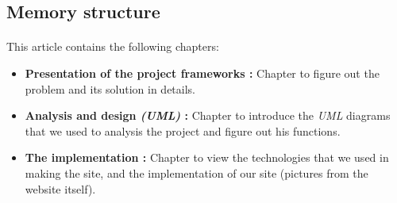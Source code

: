 	\subsection{Memory structure}
		\paragraph{}
		This article contains the following chapters:
			\begin{itemize}
				
				\item \textbf{Presentation of the project frameworks :}
				Chapter to figure out the problem and its solution in details.
				
				\item \textbf{Analysis and design \textit{(UML)} :}
				Chapter to introduce the \textit{UML} diagrams that we used to analysis the project and figure out his functions.
				
				\item \textbf{The implementation :}
				Chapter to view  the technologies that we used in making the site, and the implementation of our site (pictures from the website itself).
				
			\end{itemize}